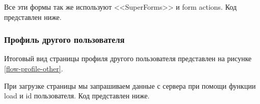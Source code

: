 
Все эти формы так же используют <<SuperForms>> и form actions. Код представлен ниже.


\subsubsection{Профиль другого пользователя}

Итоговый вид страницы профиля другого пользователя представлен на рисунке \ref{flow-profile-other}.


При загрузке страницы мы запрашиваем данные с сервера при помощи функции load и id пользователя. Код представлен ниже.

